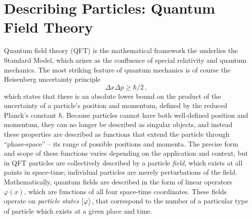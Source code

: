 \section{Describing Particles: Quantum Field Theory}

    Quantum field theory (QFT) is the mathematical framework the underlies the Standard Model,
        which arises as the confluence of special relativity and quantum mechanics.
    The most striking feature of quantum mechanics is of course the Heisenberg uncertainty principle
        \begin{equation}
            \Delta x \Delta p \geq \hbar/2 \,,
        \end{equation}
        which states that there is an absolute lower bound on the
        product of the uncertainty of a particle's position and momentum,
        defined by the reduced Planck's constant $\hbar$.
    Because particles cannot have both well-defined position and momentum,
        they can no longer be described as singular objects,
        and instead these properties are described as functions that extend the particle through 
        ``phase-space'' -- its range of possible positions and momenta.
    The precise form and scope of these functions varies depending on the application and context,
        but in QFT particles are collectively described by a particle \textit{field},
        which exists at all points in space-time;
        individual particles are merely perturbations of the field.
    Mathematically, quantum fields are described in the form of linear operators $\varphi(x)$,
        which are functions of all four space-time coordinates.
    These fields operate on \textit{particle states} $\big| \varphi \big>$,
        that correspond to the number of a particular type of particle which exists at a given place and time.


